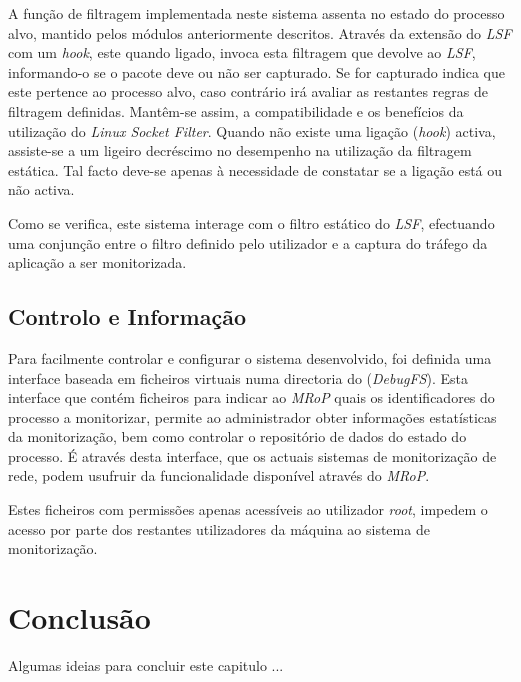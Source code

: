 A função de filtragem implementada neste sistema assenta no estado do processo alvo, mantido pelos módulos anteriormente descritos.
Através da extensão do \textit{LSF} com um \textit{hook}, este quando ligado, invoca esta filtragem que devolve ao \textit{LSF}, informando-o se o pacote deve ou não ser capturado.
Se for capturado indica que este pertence ao processo alvo, caso contrário irá avaliar as restantes regras de filtragem definidas.
Mantêm-se assim, a compatibilidade e os benefícios da utilização do \textit{Linux Socket Filter}.
Quando não existe uma ligação (\textit{hook}) activa, assiste-se a um ligeiro decréscimo no desempenho na utilização da filtragem estática.
Tal facto deve-se apenas à necessidade de constatar se a ligação está ou não activa.

Como se verifica, este sistema interage com o filtro estático do \textit{LSF}, efectuando uma conjunção entre o filtro definido pelo utilizador e a captura do tráfego da aplicação a ser monitorizada.

\subsection{Controlo e Informação}
\label{sub:data_information}

Para facilmente controlar e configurar o sistema desenvolvido, foi definida uma interface baseada em ficheiros virtuais numa directoria do (\textit{DebugFS}).
Esta interface que contém ficheiros para indicar ao \textit{MRoP} quais os identificadores do processo a monitorizar, permite ao administrador obter informações estatísticas da monitorização, bem como controlar o repositório de dados do estado do processo.
É através desta interface, que os actuais sistemas de monitorização de rede, podem usufruir da funcionalidade disponível através do \textit{MRoP}.

Estes ficheiros com permissões apenas acessíveis ao utilizador \textit{root}, impedem o acesso por parte dos restantes utilizadores da máquina ao sistema de monitorização.

\section{Conclusão}

Algumas ideias para concluir este capitulo ...

